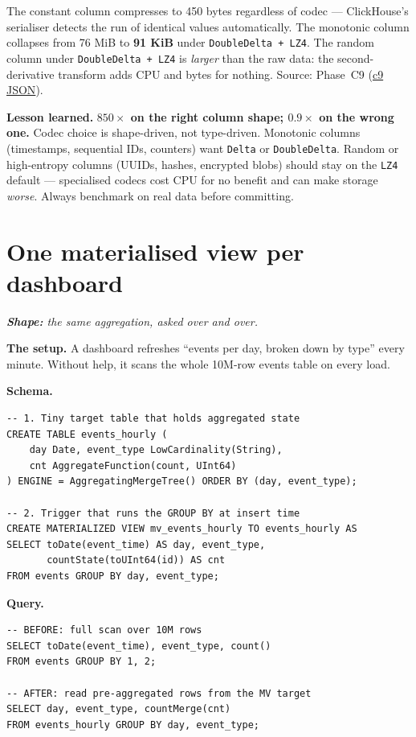 \documentclass[11pt]{article}
\newcommand{\shape}[1]{%
  \par\noindent\textit{\textbf{Shape:} #1}\par\smallskip}
\newcommand{\schemaHd}{%
  \par\smallskip\noindent\textbf{\color{accentblue}Schema.}\par\nopagebreak\smallskip}
\newcommand{\queryHd}{%
  \par\smallskip\noindent\textbf{\color{accentblue}Query.}\par\nopagebreak\smallskip}
\newcommand{\lesson}[1]{%
  \par\medskip
  \begin{lessonbox}\textbf{\color{accentgreen}Lesson learned.}\enspace #1\end{lessonbox}}
\begin{document}
\smallskip
The constant column compresses to 450 bytes regardless of codec —
ClickHouse's serialiser detects the run of identical values
automatically. The monotonic column collapses from 76 MiB to
\textbf{91 KiB} under \texttt{DoubleDelta + LZ4}. The random column
under \texttt{DoubleDelta + LZ4} is \emph{larger} than the raw data:
the second-derivative transform adds CPU and bytes for nothing.
Source: Phase~C9
(\href{run:results/experiment_c9_delta_encoding_20260504_001206.json}{c9 JSON}).

\lesson{%
\textbf{$850\times$ on the right column shape; $0.9\times$ on the
wrong one.} Codec choice is shape-driven, not type-driven.
Monotonic columns (timestamps, sequential IDs, counters) want
\texttt{Delta} or \texttt{DoubleDelta}. Random or high-entropy
columns (UUIDs, hashes, encrypted blobs) should stay on the
\texttt{LZ4} default — specialised codecs cost CPU for no benefit
and can make storage \emph{worse}. Always benchmark on real data
before committing.}

\section{One materialised view per dashboard}

\shape{the same aggregation, asked over and over.}

\textbf{The setup.}
A dashboard refreshes ``events per day, broken down by type'' every minute.
Without help, it scans the whole 10M-row events table on every load.

\schemaHd
\begin{lstlisting}
-- 1. Tiny target table that holds aggregated state
CREATE TABLE events_hourly (
    day Date, event_type LowCardinality(String),
    cnt AggregateFunction(count, UInt64)
) ENGINE = AggregatingMergeTree() ORDER BY (day, event_type);

-- 2. Trigger that runs the GROUP BY at insert time
CREATE MATERIALIZED VIEW mv_events_hourly TO events_hourly AS
SELECT toDate(event_time) AS day, event_type,
       countState(toUInt64(id)) AS cnt
FROM events GROUP BY day, event_type;
\end{lstlisting}

\queryHd
\begin{lstlisting}
-- BEFORE: full scan over 10M rows
SELECT toDate(event_time), event_type, count()
FROM events GROUP BY 1, 2;

-- AFTER: read pre-aggregated rows from the MV target
SELECT day, event_type, countMerge(cnt)
FROM events_hourly GROUP BY day, event_type;
\end{lstlisting}
\end{document}
